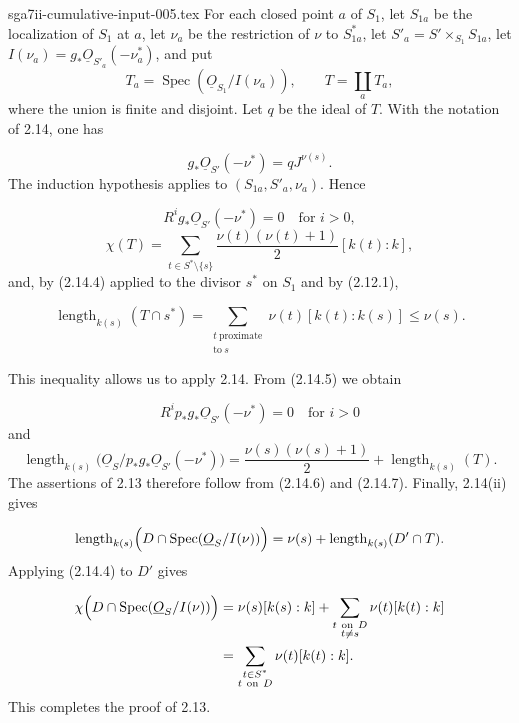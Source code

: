 \begin{filecontents*}{sga7ii-cumulative-input-005.tex}
For each closed point $a$ of $S_1$, let $S_{1a}$ be the localization of $S_1$
at $a$, let $\nu_a$ be the restriction of $\nu$ to $S_{1a}^*$, let
$S'_a=S'\times_{S_1}S_{1a}$, let
$I(\nu_a)=g_*\underline{O}_{S'_a}(-\nu_a^*)$, and put
\[
T_a=\operatorname{Spec}(\underline{O}_{S_1}/I(\nu_a)),\qquad
T=\coprod_aT_a,
\]
where the union is finite and disjoint.  Let $q$ be the ideal of $T$.  With the
notation of 2.14, one has

\begin{equation}\tag{2.14.5}
g_*\underline{O}_{S'}(-\nu^*)=qJ^{\nu(s)}.
\end{equation}
The induction hypothesis applies to $(S_{1a},S'_a,\nu_a)$.  Hence

\begin{equation}\tag{2.14.6}
R^ig_*\underline{O}_{S'}(-\nu^*)=0\quad\text{for }i>0,
\end{equation}
\begin{equation}\tag{2.14.7}
\chi(T)=
\sum_{t\in S^*\setminus\{s\}}
\frac{\nu(t)(\nu(t)+1)}2[k(t):k],
\end{equation}
and, by (2.14.4) applied to the divisor $s^*$ on $S_1$ and by (2.12.1),

\begin{equation*}
\operatorname{length}_{k(s)}(T\cap s^*)
=\sum_{\substack{t\ \mathrm{proximate}\\\mathrm{to}\ s}}
\nu(t)[k(t):k(s)]
\leq\nu(s).
\end{equation*}


This inequality allows us to apply 2.14.  From (2.14.5) we obtain

\begin{equation*}
R^ip_*g_*\underline{O}_{S'}(-\nu^*)=0
\quad\text{for }i>0
\end{equation*}
and
\begin{equation*}
\operatorname{length}_{k(s)}
\bigl(\underline{O}_S/p_*g_*\underline{O}_{S'}(-\nu^*)\bigr)
=\frac{\nu(s)(\nu(s)+1)}2+\operatorname{length}_{k(s)}(T).
\end{equation*}
The assertions of 2.13 therefore follow from (2.14.6) and (2.14.7).  Finally,
2.14(ii) gives

\begin{equation*}
\operatorname{length}_{k(s)}
\Bigl(D\cap\operatorname{Spec}(\underline{O}_S/I(\nu))\Bigr)
=\nu(s)+\operatorname{length}_{k(s)}(D'\cap T).
\end{equation*}
Applying (2.14.4) to $D'$ gives

\begin{equation*}
\begin{aligned}
\chi\Bigl(D\cap\operatorname{Spec}(\underline{O}_S/I(\nu))\Bigr)
&=\nu(s)[k(s):k]
+\sum_{\substack{t\ \mathrm{on}\ D\\t\ne s}}
\nu(t)[k(t):k]\\
&=\sum_{\substack{t\in S^*\\t\ \mathrm{on}\ D}}
\nu(t)[k(t):k].
\end{aligned}
\end{equation*}
This completes the proof of 2.13.
\end{filecontents*}
